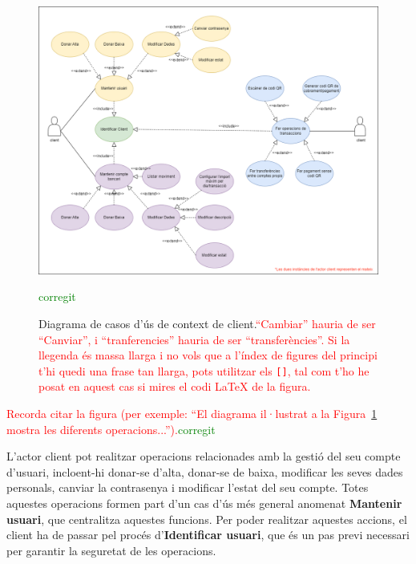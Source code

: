 \documentclass[a4paper,12pt,twoside]{ThesisStyle}
\newcommand{\pau}[1]{\textcolor{red}{#1}}
\newcommand{\sudan}[1]{\textcolor{green}{#1}}
\begin{document}
\begin{figure}[h]
    \centering
    \includegraphics[width=1\textwidth]{imatges/diagrama caso de uso client.png}
    \caption[Diagrama de casos d'ús de context de client.]{Diagrama de casos d'ús de context de client.\pau{``Cambiar'' hauria de ser ``Canviar'', i ``tranferencies'' hauria de ser ``transferències''.} \pau{Si la llegenda és massa llarga i no vols que a l'índex de figures del principi t'hi quedi una frase tan llarga, pots utilitzar els \texttt{[]}, tal com t'ho he posat en aquest cas si mires el codi LaTeX de la figura.}}\sudan{corregit}
    \label{fig:Diagrama de Casos d'Ús de Context de Client}
\end{figure}

\pau{Recorda citar la figura (per exemple: ``El diagrama il·lustrat a la Figura~\ref{fig:Diagrama de Casos d'Ús de Context de Client} mostra les diferents operacions...'').}\sudan{corregit}



L'actor client pot realitzar operacions relacionades amb la gestió del seu compte d'usuari, incloent-hi donar-se d'alta, donar-se de baixa, modificar les seves dades personals, canviar la contrasenya i modificar l'estat del seu compte. Totes aquestes operacions formen part d'un cas d'ús més general anomenat \textbf{Mantenir usuari}, que centralitza aquestes funcions. Per poder realitzar aquestes accions, el client ha de passar pel procés d'\textbf{Identificar usuari}, que és un pas previ necessari per garantir la seguretat de les operacions.\\
\end{document}
